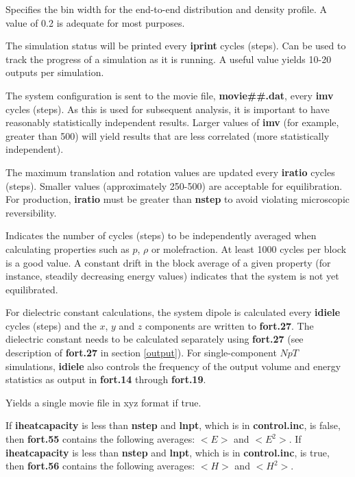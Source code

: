 \documentclass[12pt,letterpaper]{article}
\begin{document}
 Specifies the bin width for the end-to-end distribution and density profile. 
A value of 0.2 is adequate for most purposes.

 The simulation status will be printed every {\textbf{iprint}} cycles (steps).
Can be used to track the progress of a simulation as it is running.
A useful value yields 10-20 outputs per simulation.

 The system configuration is sent to the movie file, {\textbf{movie\#\#.dat}},
every {\textbf{imv}} cycles (steps).  
As this is used for subsequent analysis, it is important to have reasonably statistically independent results.
Larger values of {\textbf{imv}} (for example, greater than 500) will yield results that are less correlated
(more statistically independent).

 The maximum translation and rotation values are updated
every {\textbf{iratio}} cycles (steps).
Smaller values (approximately 250-500) are acceptable for equilibration.
For production, {\textbf{iratio}} must be greater than {\textbf{nstep}} to avoid violating microscopic reversibility.

 Indicates the number of cycles (steps) to be independently averaged 
when calculating properties such as $p$, $\rho$ or molefraction.
At least 1000 cycles per block is a good value.
A constant drift in the block average of a given property (for instance, steadily decreasing energy values) 
indicates that the system is not yet equilibrated.

For dielectric constant calculations, the system dipole is calculated every {\textbf{idiele}} cycles (steps)
and the $x$, $y$ and $z$ components are written to {\textbf{fort.27}}.
The dielectric constant needs to be calculated separately using {\textbf{fort.27}} 
(see description of {\textbf{fort.27}} in section \ref{output}).
For single-component $NpT$ simulations, {\textbf{idiele}} also controls the frequency of the output volume 
and energy statistics as output in {\textbf {fort.14}} through {\textbf {fort.19}}.  

 Yields a single movie file in xyz format if true.

 If {\textbf{iheatcapacity}} is less than {\textbf{nstep}} and {\textbf{lnpt}}, which is in {\textbf{control.inc}}, 
is false, then {\textbf{fort.55}} contains the following averages: $<E>$ and $<E^2>$.
If {\textbf{iheatcapacity}} is less than {\textbf{nstep}} and {\textbf{lnpt}}, which is in {\textbf{control.inc}}, 
is true, then {\textbf{fort.56}} contains the following averages: $<H>$ and $<H^2>$.
\end{document}
